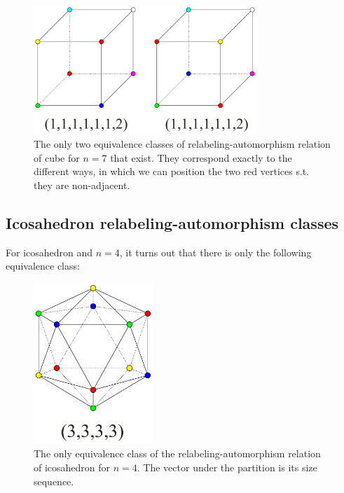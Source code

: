 \begin{figure}[H]
    \centering
    \includegraphics[width=0.75\textwidth]{Resources/Figs/cube_non_relaut-7-clrings.pdf}
    \caption{The only two equivalence classes of relabeling-automorphism relation of cube for $n=7$ that exist. They correspond exactly to the different ways, in which we can position the two red vertices s.t. they are non-adjacent.}
    \label{fig:cube-7clring-relaut-classes}
\end{figure}

\subsection{Icosahedron relabeling-automorphism classes}

For icosahedron and $n=4$, it turns out that there is only the following equivalence class:

\begin{figure}[H]
    \centering
    \includegraphics[width=0.4\textwidth]{Resources/Figs/icosahedron_non_relaut-4-clrings.pdf}
    \caption{The only equivalence class of the relabeling-automorphism relation of icosahedron for $n=4$. The vector under the partition is its size sequence.}
    \label{fig:icosahedron-4clring-relaut-classes}
\end{figure}

